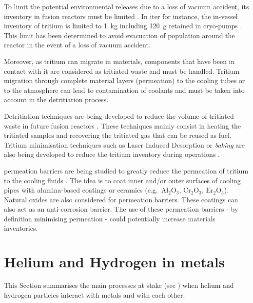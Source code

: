 To limit the potential environmental releases due to a loss of vacuum accident, its \gls{inventory} in fusion reactors must be limited .
In \acrshort{iter} for instance, the in-vessel \gls{inventory} of tritium is limited to \SI{1}{kg} including \SI{120}{g} retained in cryo-pumps .
This limit has been determined to avoid evacuation of population around the reactor in the event of a loss of vacuum accident.

Moreover, as tritium can migrate in materials, components that have been in contact with it are considered as tritiated waste and must be handled.
Tritium migration through complete material layers (\gls{permeation}) to the cooling tubes  or to the atmosphere can lead to contamination of coolants and must be taken into account in the detritiation process.

Detritiation techniques are being developed to reduce the volume of tritiated waste in future fusion reactors .
These techniques mainly consist in heating the tritiated samples and recovering the tritiated gas  that can be reused as fuel.
Tritium minimisation techniques such as Laser Induced Desorption or \emph{baking} are also being developed to reduce the tritium \gls{inventory} during operations .

\Gls{permeation} barriers are being studied to greatly reduce the \gls{permeation} of tritium to the cooling fluids .
The idea is to coat inner and/or outer surfaces of cooling pipes with alumina-based coatings or ceramics (e.g.\ $\mathrm{Al_2 O_3}$, $\mathrm{Cr_2 O_3}$, $\mathrm{Er_2 O_3}$).
Natural oxides are also considered for \gls{permeation} barriers.
These coatings can also act as an anti-corrosion barrier.
The use of these \gls{permeation} barriers - by definition minimising \gls{permeation} - could potentially increase materials inventories.

\section{Helium and Hydrogen in metals}

This Section summarises the main processes at stake (see ) when helium and hydrogen particles interact with metals and with each other.

